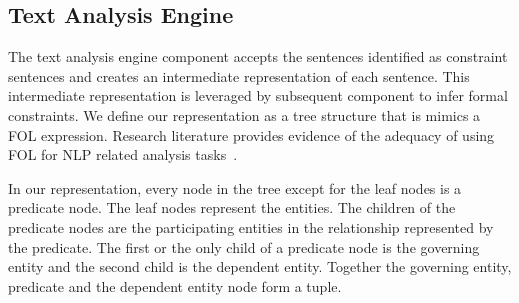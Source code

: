  
%


\subsection{Text Analysis Engine}
\label{sub:TAE}




The text analysis engine component accepts the sentences identified as constraint sentences and creates an intermediate representation of each sentence.
This intermediate representation is leveraged by subsequent component to infer formal constraints.
We define our representation as a tree structure that is mimics a FOL expression.
Research literature provides evidence of the adequacy of using FOL for NLP related analysis tasks~\cite{Sinha2009,Sinha2010,pandita12:inferring, pandita13:WHYPER}.

In our representation, every node in the tree except for the leaf nodes is a predicate node. 
The leaf nodes represent the entities.
The children of the predicate nodes are the participating entities in the relationship represented by the predicate.
The first or the only child of a predicate node is the governing entity and the second child is the dependent entity.
Together the governing entity, predicate and the dependent entity node form a tuple.  


